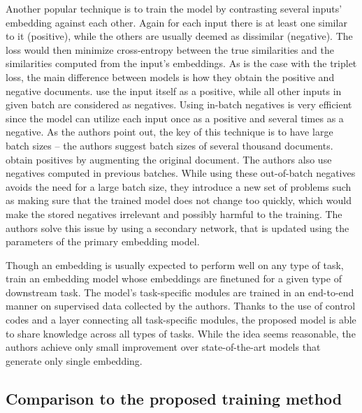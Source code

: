 Another popular technique is to train the model by contrasting several inputs'
embedding against each other. Again for each input there is at least one
similar to it (positive), while the others are usually deemed as dissimilar
(negative). The loss would then minimize cross-entropy between the true
similarities and the similarities computed from the input's embeddings. As is
the case with the triplet loss, the main difference between models is how they
obtain the positive and negative documents. \cite{neelakantan2022text} use the
input itself as a positive, while all other inputs in given batch are
considered as negatives. Using in-batch negatives is very efficient since the
model can utilize each input once as a positive and several times as a
negative. As the authors point out, the key of this technique is to have large
batch sizes -- the authors suggest batch sizes of several thousand documents.
\cite{izacard2021unsupervised} obtain positives by augmenting the original
document. The authors also use negatives computed in previous batches. While
using these out-of-batch negatives avoids the need for a large batch size, they
introduce a new set of problems such as making sure that the trained model does
not change too quickly, which would make the stored negatives irrelevant and
possibly harmful to the training. The authors solve this issue by using a
secondary network, that is updated using the parameters of the primary
embedding model.

Though an embedding is usually expected to perform well on any type of task,
\cite{singh2022scirepeval} train an embedding model whose embeddings are
finetuned for a given type of downstream task. The model's task-specific
modules are trained in an end-to-end manner on supervised data collected by the
authors. Thanks to the use of control codes and a layer connecting all
task-specific modules, the proposed model is able to share knowledge across all
types of tasks. While the idea seems reasonable, the authors achieve only small
improvement over state-of-the-art models that generate only single embedding.

\subsection{Comparison to the proposed training method}

